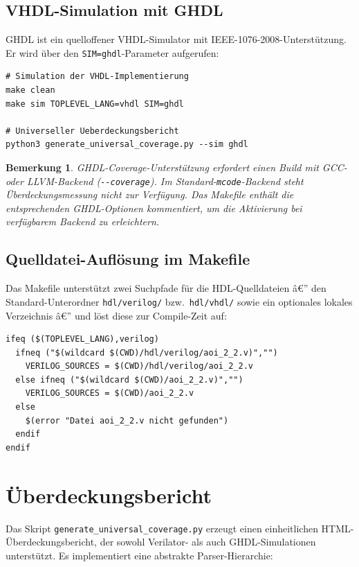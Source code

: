 ﻿\documentclass[12pt,a4paper]{report}
\newtheorem{bemerkung}[theorem]{Bemerkung}
\begin{document}
\subsection{VHDL-Simulation mit GHDL}

GHDL ist ein quelloffener VHDL-Simulator mit IEEE-1076-2008-Unterstützung.
Er wird über den \texttt{SIM=ghdl}-Parameter aufgerufen:

\begin{lstlisting}[style=bashstyle, caption={VHDL-Simulation mit GHDL}]
# Simulation der VHDL-Implementierung
make clean
make sim TOPLEVEL_LANG=vhdl SIM=ghdl

# Universeller Ueberdeckungsbericht
python3 generate_universal_coverage.py --sim ghdl
\end{lstlisting}

\begin{bemerkung}
GHDL-Coverage-Unterstützung erfordert einen Build mit GCC- oder LLVM-Backend
(\texttt{-{}-coverage}). Im Standard-\texttt{mcode}-Backend steht
Überdeckungsmessung nicht zur Verfügung. Das Makefile enthält die
entsprechenden GHDL-Optionen kommentiert, um die Aktivierung bei verfügbarem
Backend zu erleichtern.
\end{bemerkung}

\subsection{Quelldatei-Auflösung im Makefile}

Das Makefile unterstützt zwei Suchpfade für die HDL-Quelldateien â€” den
Standard-Unterordner \texttt{hdl/verilog/} bzw.\ \texttt{hdl/vhdl/} sowie
ein optionales lokales Verzeichnis â€” und löst diese zur Compile-Zeit auf:

\begin{lstlisting}[style=bashstyle, caption={Robuste Quelldatei-Suche im Makefile}]
ifeq ($(TOPLEVEL_LANG),verilog)
  ifneq ("$(wildcard $(CWD)/hdl/verilog/aoi_2_2.v)","")
    VERILOG_SOURCES = $(CWD)/hdl/verilog/aoi_2_2.v
  else ifneq ("$(wildcard $(CWD)/aoi_2_2.v)","")
    VERILOG_SOURCES = $(CWD)/aoi_2_2.v
  else
    $(error "Datei aoi_2_2.v nicht gefunden")
  endif
endif
\end{lstlisting}

\section{Überdeckungsbericht}
\label{subsec:coverage_report}

Das Skript \texttt{generate\_universal\_coverage.py} erzeugt einen
einheitlichen HTML-Über\-deckungsbericht, der sowohl Verilator- als auch
GHDL-Simulationen unterstützt. Es implementiert eine abstrakte Parser-Hierarchie:
\end{document}

